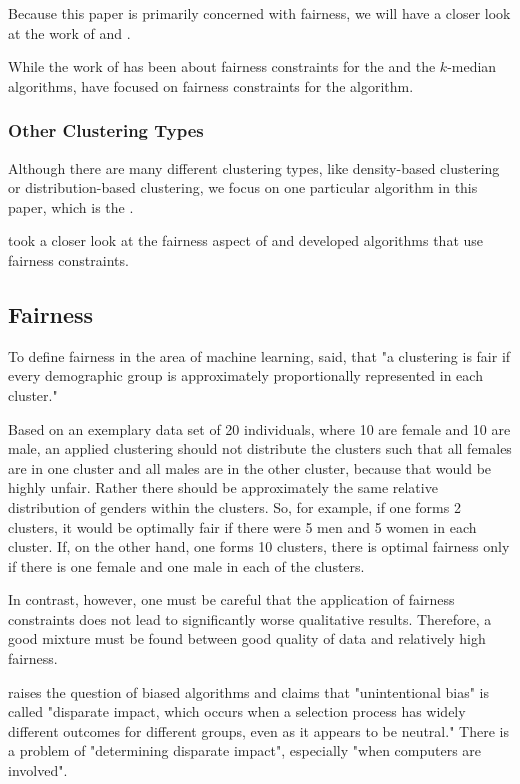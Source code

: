 Because this paper is primarily concerned with fairness, we will have a closer look at the work of \textcite[]{Chierichetti2018} and \textcite[]{Schmidt2018}.

While the work of \textcite[]{Chierichetti2018} has been about fairness constraints for the  and the $k$-median algorithms, \textcite[]{Schmidt2018} have focused on fairness constraints for the  algorithm.

\subsubsection{Other Clustering Types}

Although there are many different clustering types, like density-based clustering or distribution-based clustering, we focus on one particular algorithm in this paper, which is the .

\textcite[]{Kleindessner2019} took a closer look at the fairness aspect of  and developed algorithms that use fairness constraints.


\subsection{Fairness}

To define fairness in the area of machine learning, \textcite[1]{Kleindessner2019} said, that "a clustering is fair if every demographic group is approximately proportionally represented in each cluster."

Based on an exemplary data set of 20 individuals, where 10 are female and 10 are male, an applied clustering should not distribute the clusters such that all females are in one cluster and all males are in the other cluster, because that would be highly unfair. Rather there should be approximately the same relative distribution of genders within the clusters. So, for example, if one forms 2 clusters, it would be optimally fair if there were 5 men and 5 women in each cluster. If, on the other hand, one forms 10 clusters, there is optimal fairness only if there is one female and one male in each of the clusters.

In contrast, however, one must be careful that the application of fairness constraints does not lead to significantly worse qualitative results. Therefore, a good mixture must be found between good quality of data and relatively high fairness.

\textcite[1]{Feldman2014CertifyingImpact} raises the question of biased algorithms and claims that "unintentional bias" is called "disparate impact, which occurs when a selection process has widely different outcomes for different groups, even as it appears to be neutral." There is a problem of "determining disparate impact", especially "when computers are involved".

